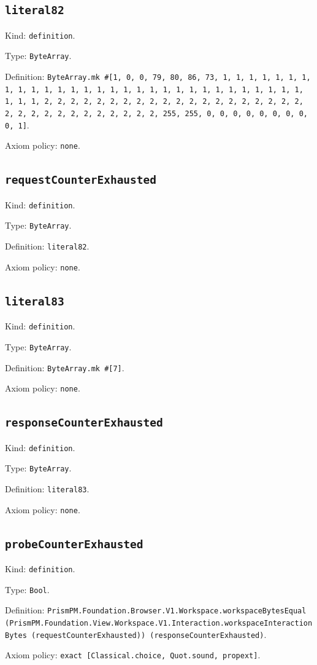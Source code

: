 \documentclass[11pt]{article}
\begin{document}
\subsection*{\texttt{literal82}}
\noindent Kind: \texttt{definition}.\par
\noindent Type: \texttt{ByteArray}.\par
\noindent Definition: \texttt{ByteArray.mk \#[1, 0, 0, 79, 80, 86, 73, 1, 1, 1, 1, 1, 1, 1, 1, 1, 1, 1, 1, 1, 1, 1, 1, 1, 1, 1, 1, 1, 1, 1, 1, 1, 1, 1, 1, 1, 1, 1, 1, 1, 2, 2, 2, 2, 2, 2, 2, 2, 2, 2, 2, 2, 2, 2, 2, 2, 2, 2, 2, 2, 2, 2, 2, 2, 2, 2, 2, 2, 2, 2, 2, 2, 255, 255, 0, 0, 0, 0, 0, 0, 0, 0, 0, 1]}.\par
\noindent Axiom policy: \texttt{none}.\par
\subsection*{\texttt{requestCounterExhausted}}
\noindent Kind: \texttt{definition}.\par
\noindent Type: \texttt{ByteArray}.\par
\noindent Definition: \texttt{literal82}.\par
\noindent Axiom policy: \texttt{none}.\par
\subsection*{\texttt{literal83}}
\noindent Kind: \texttt{definition}.\par
\noindent Type: \texttt{ByteArray}.\par
\noindent Definition: \texttt{ByteArray.mk \#[7]}.\par
\noindent Axiom policy: \texttt{none}.\par
\subsection*{\texttt{responseCounterExhausted}}
\noindent Kind: \texttt{definition}.\par
\noindent Type: \texttt{ByteArray}.\par
\noindent Definition: \texttt{literal83}.\par
\noindent Axiom policy: \texttt{none}.\par
\subsection*{\texttt{probeCounterExhausted}}
\noindent Kind: \texttt{definition}.\par
\noindent Type: \texttt{Bool}.\par
\noindent Definition: \texttt{PrismPM.Foundation.Browser.V1.Workspace.workspaceBytesEqual (PrismPM.Foundation.View.Workspace.V1.Interaction.workspaceInteractionBytes (requestCounterExhausted)) (responseCounterExhausted)}.\par
\noindent Axiom policy: \texttt{exact [Classical.choice, Quot.sound, propext]}.\par
\end{document}
